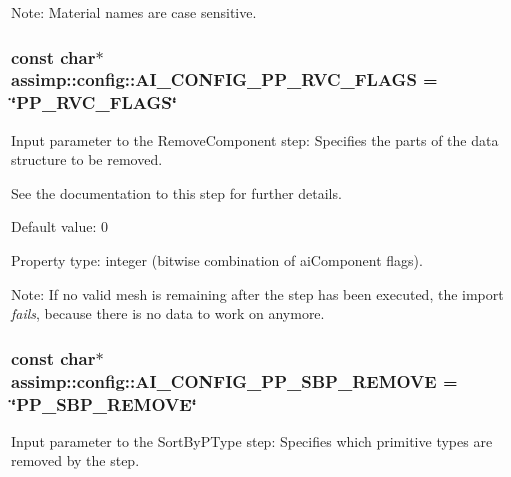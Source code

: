 Note\+: Material names are case sensitive. \hypertarget{namespaceassimp_1_1config_aedb303ccb1ccc2e8af792c093dd9260c}{
\subsubsection[{A\+I\+\_\+\+C\+O\+N\+F\+I\+G\+\_\+\+P\+P\+\_\+\+R\+V\+C\+\_\+\+F\+L\+A\+G\+S}]{\setlength{\rightskip}{0pt plus 5cm}const char$\ast$ assimp\+::config\+::\+A\+I\+\_\+\+C\+O\+N\+F\+I\+G\+\_\+\+P\+P\+\_\+\+R\+V\+C\+\_\+\+F\+L\+A\+G\+S = \char`\"{}P\+P\+\_\+\+R\+V\+C\+\_\+\+F\+L\+A\+G\+S\char`\"{}}}\label{namespaceassimp_1_1config_aedb303ccb1ccc2e8af792c093dd9260c}
Input parameter to the {\ttfamily Remove\+Component} step\+: Specifies the parts of the data structure to be removed.

See the documentation to this step for further details.

Default value\+: 0

Property type\+: integer (bitwise combination of {\ttfamily ai\+Component} flags).

Note\+: If no valid mesh is remaining after the step has been executed, the import {\itshape fails}, because there is no data to work on anymore. \hypertarget{namespaceassimp_1_1config_ace7be736580879656e93bc3cc3f7ff46}{
\subsubsection[{A\+I\+\_\+\+C\+O\+N\+F\+I\+G\+\_\+\+P\+P\+\_\+\+S\+B\+P\+\_\+\+R\+E\+M\+O\+V\+E}]{\setlength{\rightskip}{0pt plus 5cm}const char$\ast$ assimp\+::config\+::\+A\+I\+\_\+\+C\+O\+N\+F\+I\+G\+\_\+\+P\+P\+\_\+\+S\+B\+P\+\_\+\+R\+E\+M\+O\+V\+E = \char`\"{}P\+P\+\_\+\+S\+B\+P\+\_\+\+R\+E\+M\+O\+V\+E\char`\"{}}}\label{namespaceassimp_1_1config_ace7be736580879656e93bc3cc3f7ff46}
Input parameter to the {\ttfamily Sort\+By\+P\+Type} step\+: Specifies which primitive types are removed by the step.

